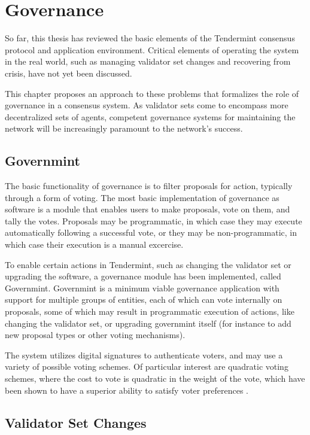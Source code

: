 \chapter{Governance}
\label{ch:governance}

So far, this thesis has reviewed the basic elements of the Tendermint consensus protocol and application environment.
Critical elements of operating the system in the real world, such as managing validator set changes
and recovering from crisis, have not yet been discussed. 

This chapter proposes an approach to these problems that formalizes the role of governance in a consensus system.
As validator sets come to encompass more decentralized sets of agents, competent governance systems 
for maintaining the network will be increasingly paramount to the network's success.

\section{Governmint}

The basic functionality of governance is to filter proposals for action, typically through a form of voting.
The most basic implementation of governance as software is a module that enables users to make proposals,
vote on them, and tally the votes. 
Proposals may be programmatic, in which case they may execute automatically following a successful vote,
or they may be non-programmatic, in which case their execution is a manual excercise.

To enable certain actions in Tendermint, such as changing the validator set or upgrading the software,
a governance module has been implemented, called Governmint.
Governmint is a minimum viable governance application with support for multiple groups of entities,
each of which can vote internally on proposals, some of which may result in programmatic execution of actions,
like changing the validator set, or upgrading governmint itself (for instance to add new proposal types or other voting mechanisms).

The system utilizes digital signatures to authenticate voters, 
and may use a variety of possible voting schemes.
Of particular interest are quadratic voting schemes,
where the cost to vote is quadratic in the weight of the vote,
which have been shown to have a superior ability to satisfy voter preferences \cite{quadratic_voting}.

\section{Validator Set Changes}

